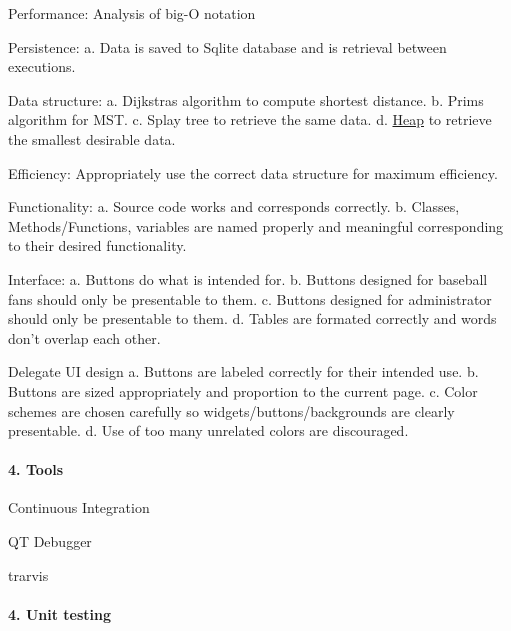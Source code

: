 \begin{DoxyEnumerate}
\item Performance\+: Analysis of big-\/O notation
\item Persistence\+: a. Data is saved to Sqlite database and is retrieval between executions.
\item Data structure\+: a. Dijkstra\textquotesingle{}s algorithm to compute shortest distance. b. Prim\textquotesingle{}s algorithm for M\+ST. c. Splay tree to retrieve the same data. d. \hyperlink{class_heap}{Heap} to retrieve the smallest desirable data.
\item Efficiency\+: Appropriately use the correct data structure for maximum efficiency.
\item Functionality\+: a. Source code works and corresponds correctly. b. Classes, Methods/\+Functions, variables are named properly and meaningful corresponding to their desired functionality.
\item Interface\+: a. Buttons do what is intended for. b. Buttons designed for baseball fans should only be presentable to them. c. Buttons designed for administrator should only be presentable to them. d. Tables are formated correctly and words don’t overlap each other.
\item Delegate UI design a. Buttons are labeled correctly for their intended use. b. Buttons are sized appropriately and proportion to the current page. c. Color schemes are chosen carefully so widgets/buttons/backgrounds are clearly presentable. d. Use of too many unrelated colors are discouraged.
\end{DoxyEnumerate}

\paragraph*{4. Tools}


\begin{DoxyEnumerate}
\item Continuous Integration
\item QT Debugger
\item trarvis
\end{DoxyEnumerate}

\paragraph*{4. Unit testing}


